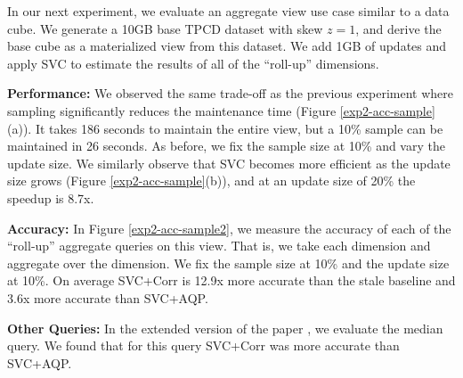 

In our next experiment, we evaluate an aggregate view use case similar to a data cube.
We generate a 10GB base TPCD dataset with skew $z=1$, and derive the base cube as a materialized view from this dataset.
We add 1GB of updates and apply SVC to estimate the results of all of the ``roll-up'' dimensions.

\textbf{Performance: }
We observed the same trade-off as the previous experiment where sampling significantly reduces the maintenance time (Figure \ref{exp2-acc-sample}(a)).
It takes 186 seconds to maintain the entire view, but a 10\% sample can be maintained in 26 seconds.
As before, we fix the sample size at 10\% and vary the update size.
We similarly observe that SVC becomes more efficient as the update size grows (Figure \ref{exp2-acc-sample}(b)), and at an update size of 20\%  the speedup is 8.7x.

\textbf{Accuracy: }
In Figure \ref{exp2-acc-sample2}, we measure the accuracy of each of the ``roll-up'' aggregate queries on this view.
That is, we take each dimension and aggregate over the dimension.
We fix the sample size at 10\% and the update size at 10\%.
On average SVC+Corr is 12.9x more accurate than the stale baseline and 3.6x more accurate than SVC+AQP. 


\textbf{Other Queries: } In the extended version of the paper \cite{technicalReport}, we evaluate the median query. We found that for this query SVC+Corr was more accurate than SVC+AQP.

